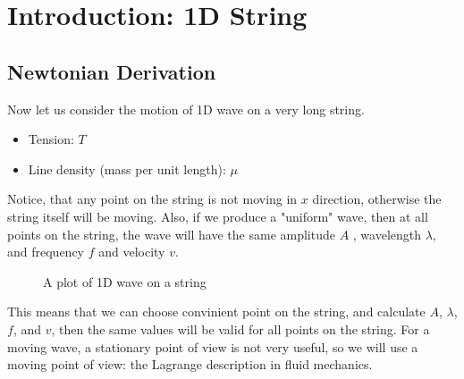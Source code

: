 \section{Introduction: 1D String}
\subsection{Newtonian Derivation}
Now let us consider the motion of 1D wave on a very long string.
\begin{itemize}
  \item Tension: $T$
  \item Line density (mass per unit length): $\mu$
\end{itemize}
Notice, that any point on the string is not moving in $x$ direction, otherwise the string itself will be moving.
Also, if we produce a "uniform" wave, then at all points on the string, the wave will have the same amplitude $A$ , wavelength $\lambda$, and frequency $f$  and velocity $v$.
\begin{figure}[htbp]
  \centering
  \caption{A plot of 1D wave on a string}
  \label{fig:string}
\end{figure}
This means that we can choose convinient point on the string, and calculate $A$, $\lambda$, $f$, and $v$, then the same values will be valid for all points on the string.
For a moving wave, a stationary point of view is not very useful, so we will use a moving point of view: the Lagrange description in fluid mechanics.

